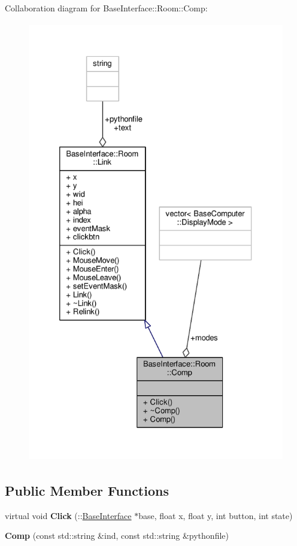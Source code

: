 Collaboration diagram for Base\+Interface\+:\+:Room\+:\+:Comp\+:
\nopagebreak
\begin{figure}[H]
\begin{center}
\leavevmode
\includegraphics[height=550pt]{d8/d23/classBaseInterface_1_1Room_1_1Comp__coll__graph}
\end{center}
\end{figure}
\subsection*{Public Member Functions}
\begin{DoxyCompactItemize}
\item 
virtual void {\bfseries Click} (\+::\hyperlink{classBaseInterface}{Base\+Interface} $\ast$base, float x, float y, int button, int state)\hypertarget{classBaseInterface_1_1Room_1_1Comp_a9b6248c8c3cf2bbf74c766ed0b146eb5}{}\label{classBaseInterface_1_1Room_1_1Comp_a9b6248c8c3cf2bbf74c766ed0b146eb5}

\item 
{\bfseries Comp} (const std\+::string \&ind, const std\+::string \&pythonfile)\hypertarget{classBaseInterface_1_1Room_1_1Comp_a4e0fcde70cb29a232c9908b28ed7190a}{}\label{classBaseInterface_1_1Room_1_1Comp_a4e0fcde70cb29a232c9908b28ed7190a}

\end{DoxyCompactItemize}
